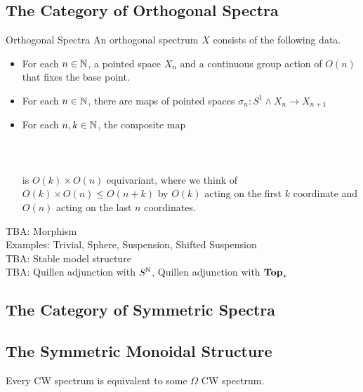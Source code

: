 \documentclass[a4paper]{article}
\begin{document}
\subsection{The Category of Orthogonal Spectra}
\begin{defn}{Orthogonal Spectra}{} An orthogonal spectrum $X$ consists of the following data. 
\begin{itemize}
\item For each $n\in\mathbb{N}$, a pointed space $X_n$ and a continuous group action of $O(n)$ that fixes the base point. 
\item For each $n\in\mathbb{N}$, there are maps of pointed spaces $\sigma_n:S^1\wedge X_n\to X_{n+1}$
\item For each $n,k\in\mathbb{N}$, the composite map \\~\\
\\~\\
is $O(k)\times O(n)$ equivariant, where we think of $O(k)\times O(n)\leq O(n+k)$ by $O(k)$ acting on the first $k$ coordinate and $O(n)$ acting on the last $n$ coordinates. 
\end{itemize}
\end{defn}

TBA: Morphism\\
Examples: Trivial, Sphere, Suspension, Shifted Suspension\\
TBA: Stable model structure\\
TBA: Quillen adjunction with $S^{\mathbb{N}}$, Quillen adjunction with $\bold{Top}_\ast$

\subsection{The Category of Symmetric Spectra}

\subsection{The Symmetric Monoidal Structure}

\begin{thm}{}{} Every CW spectrum is equivalent to some $\Omega$ CW spectrum. 
\end{thm}
\end{document}
